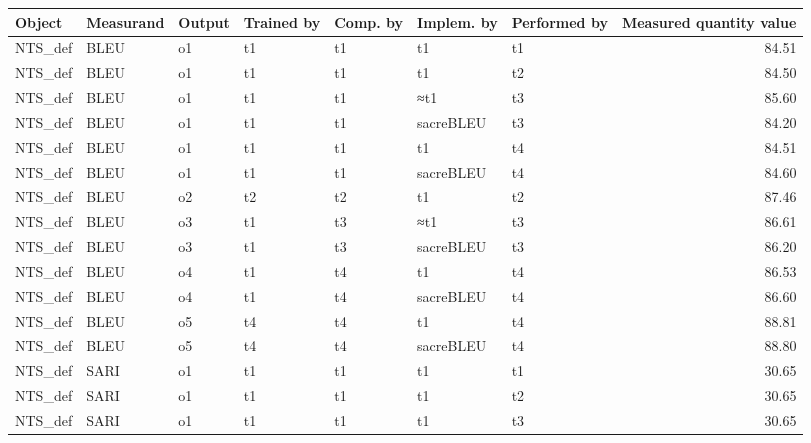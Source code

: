 \begin{tabular}{lllllllr}
\toprule
      Object & Measurand & Output & Trained by & Comp. by & Implem. by & Performed by & Measured quantity value \\
\midrule
     NTS\_def &      BLEU &     o1 &         t1 &       t1 &         t1 &           t1 &                   84.51 \\
     NTS\_def &      BLEU &     o1 &         t1 &       t1 &         t1 &           t2 &                   84.50 \\
     NTS\_def &      BLEU &     o1 &         t1 &       t1 &        ≈t1 &           t3 &                   85.60 \\
     NTS\_def &      BLEU &     o1 &         t1 &       t1 &  sacreBLEU &           t3 &                   84.20 \\
     NTS\_def &      BLEU &     o1 &         t1 &       t1 &         t1 &           t4 &                   84.51 \\
     NTS\_def &      BLEU &     o1 &         t1 &       t1 &  sacreBLEU &           t4 &                   84.60 \\
     NTS\_def &      BLEU &     o2 &         t2 &       t2 &         t1 &           t2 &                   87.46 \\
     NTS\_def &      BLEU &     o3 &         t1 &       t3 &        ≈t1 &           t3 &                   86.61 \\
     NTS\_def &      BLEU &     o3 &         t1 &       t3 &  sacreBLEU &           t3 &                   86.20 \\
     NTS\_def &      BLEU &     o4 &         t1 &       t4 &         t1 &           t4 &                   86.53 \\
     NTS\_def &      BLEU &     o4 &         t1 &       t4 &  sacreBLEU &           t4 &                   86.60 \\
     NTS\_def &      BLEU &     o5 &         t4 &       t4 &         t1 &           t4 &                   88.81 \\
     NTS\_def &      BLEU &     o5 &         t4 &       t4 &  sacreBLEU &           t4 &                   88.80 \\
     NTS\_def &      SARI &     o1 &         t1 &       t1 &         t1 &           t1 &                   30.65 \\
     NTS\_def &      SARI &     o1 &         t1 &       t1 &         t1 &           t2 &                   30.65 \\
     NTS\_def &      SARI &     o1 &         t1 &       t1 &         t1 &           t3 &                   30.65 \\

\end{tabular}
